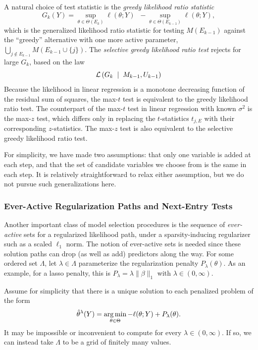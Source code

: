 \documentclass{article}
\begin{document}
A natural choice of test statistic is the {\em greedy likelihood ratio statistic}
\begin{equation}\label{eq:greedyLRT}
G_k(Y) = \sup_{\theta\in \Theta(E_k)} {\ell(\theta; Y)} \;\;- \sup_{\theta\in \Theta(E_{k-1})} {\ell(\theta; Y)},
\end{equation}
which is the generalized likelihood ratio statistic for testing $M(E_{k-1})$ against the ``greedy'' alternative with one more active parameter, $\bigcup_{j \notin E_{k-1}} M(E_{k-1} \cup \{j\})$. The {\em selective greedy likelihood ratio test} rejects for large $G_k$, based on the law
\begin{equation*}
\mathcal{L}\left(G_k \;\mid\; M_{k-1}, U_{k-1}\right)
\end{equation*}
Because the likelihood in linear regression is a monotone decreasing function of the residual sum of squares, the max-$t$ test is equivalent to the greedy likelihood ratio test. The counterpart of the max-$t$ test in linear regression with known $\sigma^2$ is the max-$z$ test, which differs only in replacing the $t$-statistics $t_{j,E}$ with their corresponding $z$-statistics. The max-$z$ test is also equivalent to the selective greedy likelihood ratio test.

For simplicity, we have made two assumptions: that only one variable is added at each step, and that the set of candidate variables we choose from is the same in each step. It is relatively straightforward to relax either assumption, but we do not pursue such generalizations here.

\subsubsection{Ever-Active Regularization Paths and Next-Entry Tests}
Another important class of model selection procedures is the sequence of {\em ever-active} sets for a regularized likelihood path, under a sparsity-inducing regularizer such as a scaled $\ell_1$ norm. The notion of ever-active sets is needed since these solution paths can drop  (as well as add) predictors along the way. For some ordered set $\Lambda$, let $\lambda\in\Lambda$ parameterize the regularization penalty $P_\lambda(\theta)$. As an example, for a lasso penalty, this is $P_\lambda = \lambda\|\beta\|_1$ with $\lambda\in (0,\infty)$. 

Assume for simplicity that there is a unique solution to each penalized problem of the form
\begin{equation}\label{eq:pen-lik}
  \hat\theta^{\lambda}(Y) =
  \operatorname*{arg\,min}_{\theta\in\Theta} -\ell(\theta; Y) + P_\lambda(\theta).
\end{equation}
It may be impossible or inconvenient to compute  for every $\lambda\in(0,\infty)$. If so, we can instead take $\Lambda$ to be a grid of finitely many values. 
\end{document}
